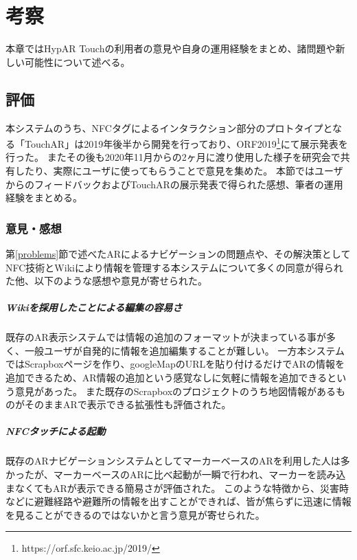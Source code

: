 \chapter{考察}
\label{chap:consideration}

本章ではHypAR Touchの利用者の意見や自身の運用経験をまとめ、諸問題や新しい可能性について述べる。

\newpage


\section{評価}
本システムのうち、NFCタグによるインタラクション部分のプロトタイプとなる「TouchAR」は2019年後半から開発を行っており、ORF2019\footnote{ \textsf{https://orf.sfc.keio.ac.jp/2019/} }にて展示発表を行った。
またその後も2020年11月からの2ヶ月に渡り使用した様子を研究会で共有したり、実際にユーザに使ってもらうことで意見を集めた。
本節ではユーザからのフィードバックおよびTouchARの展示発表で得られた感想、筆者の運用経験をまとめる。

\subsection{意見・感想}

第\ref{problems}節で述べたARによるナビゲーションの問題点や、その解決策としてNFC技術とWikiにより情報を管理する本システムについて多くの同意が得られた他、以下のような感想や意見が寄せられた。

\paragraph*{Wikiを採用したことによる編集の容易さ}
既存のAR表示システムでは情報の追加のフォーマットが決まっている事が多く、一般ユーザが自発的に情報を追加編集することが難しい。
一方本システムではScrapboxページを作り、googleMapのURLを貼り付けるだけでARの情報を追加できるため、AR情報の追加という感覚なしに気軽に情報を追加できるという意見があった。
また既存のScrapboxのプロジェクトのうち地図情報があるものがそのままARで表示できる拡張性も評価された。

\paragraph*{NFCタッチによる起動}
既存のARナビゲーションシステムとしてマーカーベースのARを利用した人は多かったが、マーカーベースのARに比べ起動が一瞬で行われ、マーカーを読み込まなくてもARが表示できる簡易さが評価された。
このような特徴から、災害時などに避難経路や避難所の情報を出すことができれば、皆が焦らずに迅速に情報を見ることができるのではないかと言う意見が寄せられた。

